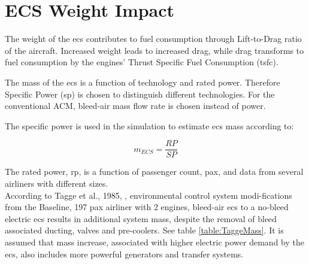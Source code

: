\documentclass[english]{kththesis}
\begin{document}
\section{ECS Weight Impact}
\label{sec:ECSweight}


The weight of the \acrshort{ecs} contributes to fuel consumption through Lift-to-Drag ratio of the aircraft. Increased weight leads to increased drag, while drag transforms to fuel consumption by the engines' Thrust Specific Fuel Consumption (\acrshort{tsfc}).

The mass of the \acrshort{ecs} is a function of technology and rated power. Therefore Specific Power (\acrshort{sp}) is chosen to distinguish different technologies. For the conventional ACM, bleed-air mass flow rate is chosen instead of power.

The specific power is used in the simulation to estimate \acrshort{ecs} mass according to:

\begin{equation}
\label{eq:ECSmass}
m_{ECS} = \frac{RP}{SP}
\end{equation}

The rated power, \acrshort{rp}, is a function of passenger count, pax, and data from several airliners with different sizes.\\

According to Tagge et al., 1985, \cite{Tagge1985}, environmental control system modi-fications from the Baseline, 197 pax airliner with 2 engines, bleed-air \acrshort{ecs} to a no-bleed electric \acrshort{ecs} results in additional system mass, despite the removal of bleed associated ducting, valves and pre-coolers. See table \ref{table:TaggeMass}. It is assumed that mass increase, associated with higher electric power demand by the \acrshort{ecs}, also includes more powerful generators and transfer systems.


\end{document}
